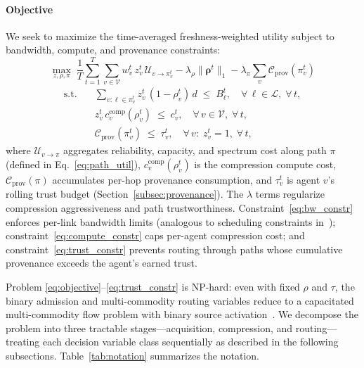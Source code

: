 \documentclass[final,3p,times,review,sort&compress]{elsarticle}
\begin{document}
\paragraph{Objective}
We seek to maximize the time-averaged freshness-weighted utility subject to bandwidth, compute, and provenance constraints:
\begin{equation}
\max_{z,\rho,\pi}\;\frac{1}{T}\sum_{t=1}^{T}\sum_{v\in\mathcal{V}} w_v^t\, z_v^t\, \mathcal{U}_{v\to\pi_v^t} - \lambda_{\rho}\|\boldsymbol{\rho}^t\|_1 - \lambda_{\pi}\sum_{v} \mathcal{C}_{\mathrm{prov}}(\pi_v^t)
\label{eq:objective}
\end{equation}
\begin{align}
\text{s.t.}\quad & \sum_{v:\ell\in\pi_v^t} z_v^t\,(1{-}\rho_v^t)\,d \;\leq\; B_\ell^t, \quad \forall\,\ell\in\mathcal{L},\; \forall\,t, \label{eq:bw_constr}\\
& z_v^t\,c_v^{\mathrm{comp}}(\rho_v^t) \;\leq\; c_v^t, \quad \forall\,v\in\mathcal{V},\; \forall\,t, \label{eq:compute_constr}\\
& \mathcal{C}_{\mathrm{prov}}(\pi_v^t) \;\leq\; \tau_v^t, \quad \forall\,v:\;z_v^t{=}1,\; \forall\,t, \label{eq:trust_constr}
\end{align}
where $\mathcal{U}_{v\to\pi}$ aggregates reliability, capacity, and spectrum cost along path $\pi$ (defined in Eq.~\ref{eq:path_util}), $c_v^{\mathrm{comp}}(\rho_v^t)$ is the compression compute cost, $\mathcal{C}_{\mathrm{prov}}(\pi)$ accumulates per-hop provenance consumption, and $\tau_v^t$ is agent $v$’s rolling trust budget (Section~\ref{subsec:provenance}). The $\lambda$ terms regularize compression aggressiveness and path trustworthiness. Constraint~\eqref{eq:bw_constr} enforces per-link bandwidth limits (analogous to scheduling constraints in~\cite{HE2023100610}); constraint~\eqref{eq:compute_constr} caps per-agent compression cost; and constraint~\eqref{eq:trust_constr} prevents routing through paths whose cumulative provenance exceeds the agent’s earned trust.

Problem \eqref{eq:objective}--\eqref{eq:trust_constr} is NP-hard: even with fixed $\rho$ and $\tau$, the binary admission and multi-commodity routing variables reduce to a capacitated multi-commodity flow problem with binary source activation~\cite{KIRAN2023103058}. We decompose the problem into three tractable stages---acquisition, compression, and routing---treating each decision variable class sequentially as described in the following subsections. Table~\ref{tab:notation} summarizes the notation.
\end{document}
